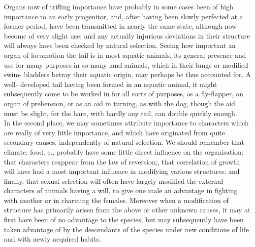 \indent Organs now of trifling importance have probably in some cases been of high importance to an early progenitor, and, after having been slowly perfected at a former period, have been transmitted in nearly the same state, although now become of very slight use; and any actually injurious deviations in their structure will always have been checked by natural selection. Seeing how important an organ of locomotion the tail is in most aquatic animals, its general presence and use for many purposes in so many land animals, which in their lungs or modified swim- bladders betray their aquatic origin, may perhaps be thus accounted for. A well- developed tail having been formed in an aquatic animal, it might subsequently come to be worked in for all sorts of purposes, as a fly-flapper, an organ of prehension, or as an aid in turning, as with the dog, though the aid must be slight, for the hare, with hardly any tail, can double quickly enough.\\
\indent In the second place, we may sometimes attribute importance to characters which are really of very little importance, and which have originated from quite secondary causes, independently of natural selection. We should remember that climate, food, c., probably have some little direct influence on the organisation; that characters reappear from the law of reversion;, that correlation of growth will have had a most important influence in modifying various structures; and finally, that sexual selection will often have largely modified the external characters of animals having a will, to give one male an advantage in fighting with another or in charming the females. Moreover when a modification of structure has primarily arisen from the above or other unknown causes, it may at first have been of no advantage to the species, but may subsequently have been taken advantage of by the descendants of the species under new conditions of life and with newly acquired habits.\\
